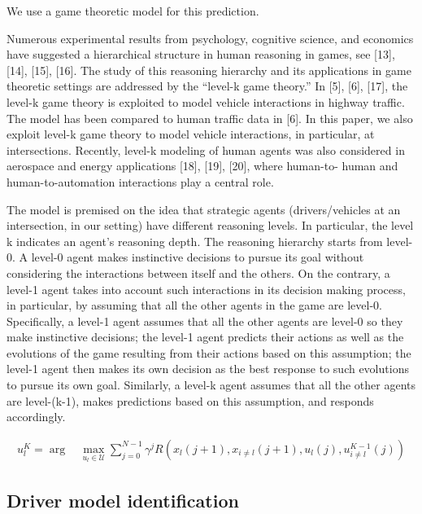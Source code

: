 \documentclass[10pt,journal]{IEEEtran}
\begin{document}
 	\noindent
 	
 	
 	 We use a game theoretic model for this prediction.
 	
 	Numerous experimental results from psychology, cognitive science, and economics have suggested a hierarchical structure in human reasoning in games, see [13], [14], [15], [16]. The study of this reasoning hierarchy and its applications in game theoretic settings are addressed by the “level-k game theory.” In [5], [6], [17], the level-k game theory is exploited to model vehicle interactions in highway traffic. The model has been compared to human traffic data in [6]. In this paper, we also exploit level-k game theory to model vehicle interactions, in particular, at intersections. Recently, level-k modeling of human agents was also considered in aerospace and energy applications [18], [19], [20], where human-to- human and human-to-automation interactions play a central role.
 	
 	
	 The model is premised on the idea that strategic agents (drivers/vehicles at an intersection, in our setting) have different reasoning levels. In particular, the level k indicates an agent’s reasoning depth. The reasoning hierarchy starts from level-0. A level-0 agent makes instinctive decisions to pursue its goal without considering the interactions between itself and the others. On the contrary, a level-1 agent takes into account such interactions in its decision making process, in particular, by assuming that all the other agents in the game are level-0. Specifically, a level-1 agent assumes that all the other agents are level-0 so they make instinctive decisions; the level-1 agent predicts their actions as well as the evolutions of the game resulting from their actions based on this assumption; the level-1 agent then makes its own decision as the best response to such evolutions to pursue its own goal. Similarly, a level-k agent assumes that all the other agents are level-(k-1), makes predictions based on this assumption, and responds accordingly.
	 

	
	
	\begin{align}
	u_{l}^K = \arg \, & \underset{u_{l} \in \mathcal{U}}{\max} \sum _{j=0}^{N-1} \gamma ^j R\left(x_{l}\left(j+1\right), x_{i\neq l}\left(j+1\right), u_{l}\left(j\right), u_{i \neq l}^{K-1}\left(j\right) \right)\nonumber
	\end{align}
	
	
	\subsection{Driver model identification}
	
\end{document}
